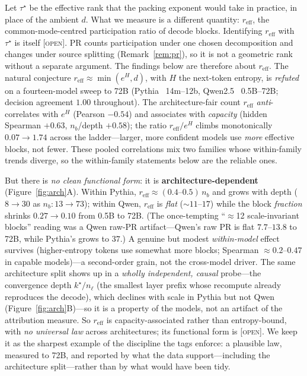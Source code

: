 \documentclass[11pt]{article}
\theoremstyle{definition}
\theoremstyle{plain}
\theoremstyle{remark}
\newcommand{\open}{\textsc{[open]}}
\begin{document}
Let $\tau^\star$ be the effective rank that the packing exponent would take in practice, in place of the
ambient $d$. What we measure is a different quantity: $r_{\mathrm{eff}}$, the common-mode-centred
participation ratio of decode blocks. Identifying $r_{\mathrm{eff}}$ with $\tau^\star$ is itself \open{}.
PR counts participation under one chosen decomposition and changes under source splitting
(Remark~\ref{rem:pr}), so it is not a geometric rank without a separate argument. The findings below are
therefore about $r_{\mathrm{eff}}$. The natural conjecture $r_{\mathrm{eff}}\approx\min(e^{H},d)$, with $H$ the
next-token entropy, is \emph{refuted} on a fourteen-model sweep to 72B (Pythia~\cite{biderman2023pythia}
14m--12b, Qwen2.5~\cite{qwen2024qwen25} 0.5B--72B; decision agreement $1.00$ throughout). The architecture-fair count $r_{\mathrm{eff}}$ \emph{anti}-correlates
with $e^{H}$ (Pearson $-0.54$) and associates with \emph{capacity} (hidden Spearman $+0.63$, $n_b$/depth
$+0.58$); the ratio $r_{\mathrm{eff}}/e^{H}$ climbs monotonically $0.07\to1.74$ across the ladder---larger,
more confident models use \emph{more} effective blocks, not fewer. These pooled correlations mix two families
whose within-family trends diverge, so the within-family statements below are the reliable ones.

But there is \emph{no clean functional form}: it is \textbf{architecture-dependent}
(Figure~\ref{fig:arch}A). Within Pythia,
$r_{\mathrm{eff}}\approx(0.4\text{--}0.5)\,n_b$ and grows with depth ($8\to30$ as $n_b:13\to73$); within
Qwen, $r_{\mathrm{eff}}$ is \emph{flat} ($\sim11\text{--}17$) while the block \emph{fraction} shrinks
$0.27\to0.10$ from 0.5B to 72B. (The once-tempting ``$\approx$12 scale-invariant blocks'' reading was a
Qwen raw-PR artifact---Qwen's raw PR is flat $7.7\text{--}13.8$ to 72B, while Pythia's grows to $37$.) A
genuine but modest \emph{within-model} effect survives (higher-entropy tokens use somewhat more blocks;
Spearman $\approx0.2\text{--}0.47$ in capable models)---a second-order grain, not the cross-model driver.
The same architecture split shows up in a \emph{wholly independent, causal} probe---the convergence depth
$k^\star/n_\ell$ (the smallest layer prefix whose recompute already reproduces the decode), which declines with
scale in Pythia but not Qwen (Figure~\ref{fig:arch}B)---so it is a property of the models, not an artifact
of the attribution measure. So $r_{\mathrm{eff}}$ is capacity-associated rather than entropy-bound, with
\emph{no universal law} across architectures; its functional form is \open{}. We keep it as the sharpest example of the discipline the
tags enforce: a plausible law, measured to 72B, and reported by what the data support---including the
architecture split---rather than by what would have been tidy.
\end{document}
